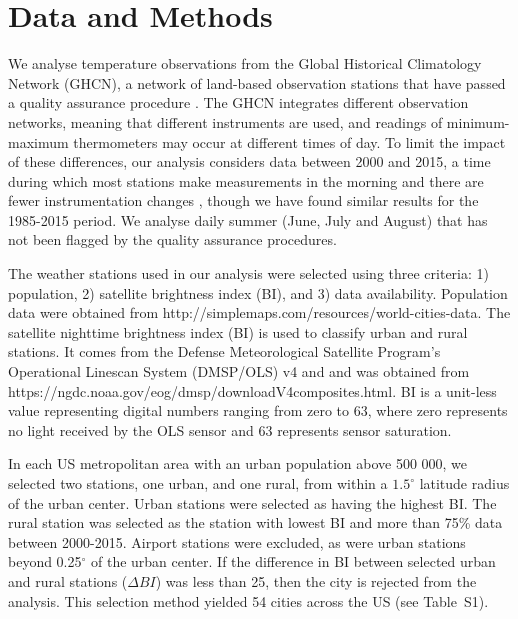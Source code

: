 \documentclass[12pt]{iopart}
\begin{document}
\section*{Data and Methods} 

We analyse temperature observations from the Global Historical Climatology Network (GHCN), a network of land-based observation stations that have passed a quality assurance procedure \cite{ghcn}. %
The GHCN integrates different observation networks, meaning that different instruments are used, and readings of minimum-maximum thermometers may occur at different times of day. 
To limit the impact of these differences, our analysis considers data between 2000 and 2015, a time during which most stations make measurements in the morning and there are fewer instrumentation changes \cite{menne2009us}, %
 though we have found similar results for the 1985-2015 period. %
We analyse daily summer (June, July and August) that has not been flagged by the quality assurance procedures.

The weather stations used in our analysis were selected using three criteria: 1) population, 2) satellite brightness index (BI), and 3) data availability.
Population data were obtained from http://simplemaps.com/resources/world-cities-data. The satellite nighttime brightness index (BI) is used to classify urban and rural stations. It comes  from the  Defense Meteorological Satellite Program's Operational Linescan System (DMSP/OLS) v4 \cite{dmspols} and %
and was obtained from https://ngdc.noaa.gov/eog/dmsp/downloadV4composites.html. BI is a unit-less value representing digital numbers ranging from zero to 63, where zero represents no light received by the OLS sensor and 63 represents sensor saturation.

In each US metropolitan area with an urban population above 500 000, we selected two stations, one urban, and one rural, from within a $1.5^\circ$ latitude radius of the urban center. Urban stations were selected as having the highest BI.  %
The rural station was selected as the station with lowest BI and more than 75\% data between 2000-2015. %
Airport stations were excluded, as were urban stations beyond 0.25$^\circ$ of the urban center. If the difference in BI between selected urban and rural stations ($\Delta BI$) was less than 25, then the city is rejected from the analysis.  This selection method yielded 54 cities across the US (see Table~S1).
\end{document}
